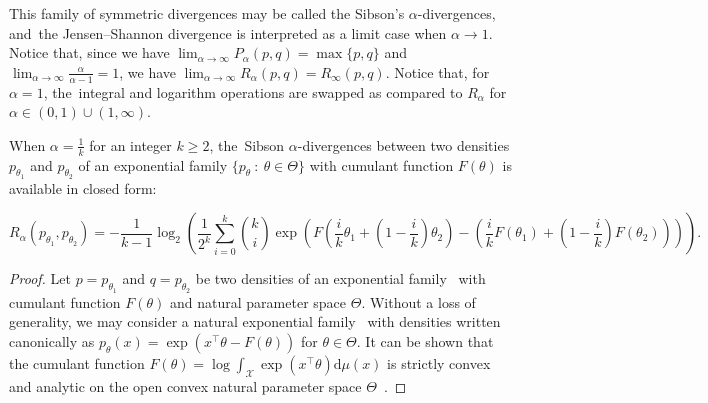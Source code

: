 \documentclass[entropy,article,accept,oneauthor,pdftex,entropy]{Definitions/mdpi}
\def\dmu{\mathrm{d}\mu}
\def\calX{\mathcal{X}}
\def\dmu{\mathrm{d}\mu}
\begin{document}
\begin{paracol}{2}
\switchcolumn


This family of symmetric divergences may be called the Sibson's $\alpha$-divergences, and~the Jensen--Shannon divergence is interpreted
 as a limit case when $\alpha\rightarrow 1$.
Notice that, since we have $\lim_{\alpha\rightarrow\infty} P_\alpha(p,q)=\max\{p,q\}$ and $\lim_{\alpha\rightarrow\infty}\frac{\alpha}{\alpha-1}=1$, we have $\lim_{\alpha\rightarrow\infty} R_\alpha(p,q)=R_\infty(p,q)$.
Notice that, for~$\alpha=1$, the~integral and logarithm operations are swapped as compared to $R_\alpha$ for $\alpha\in(0,1)\cup(1,\infty)$.


\begin{Theorem}\label{thm:cfirfracinteger}
When $\alpha=\frac{1}{k}$ for an integer $k\geq 2$, the~Sibson $\alpha$-divergences between two densities $p_{\theta_1}$ and $p_{\theta_2}$ of an exponential family $\{p_\theta\ :\ \theta\in\Theta\}$ with cumulant function $F(\theta)$ is available in closed form:
\vspace{-12pt}
\begingroup\makeatletter\def\f@size{8}\check@mathfonts
\def\maketag@@@#1{\hbox{\m@th\normalsize\normalfont#1}}%

$$
R_\alpha(p_{\theta_1},p_{\theta_2})=-\frac{1}{k-1}\log_2 \left( \frac{1}{2^k} \sum_{i=0}^k \binom{k}{i}  \exp\left(F\left(\frac{i}{k}\theta_1+\left(1-\frac{i}{k}\right)\theta_2\right)-\left(\frac{i}{k}F(\theta_1)+\left(1-\frac{i}{k}\right)F(\theta_2)\right)\right) \right).
$$
\endgroup
\end{Theorem}


\begin{proof}
Let $p=p_{\theta_1}$ and $q=p_{\theta_2}$ be two densities of an exponential family~\cite{EF-2014} with  cumulant function $F(\theta)$ and natural  parameter space $\Theta$. 
Without a loss of generality, we may consider a natural exponential family~\cite{EF-2014} with densities written canonically as $p_\theta(x)=\exp(x^\top\theta-F(\theta))$ for $\theta\in\Theta$.
It can be shown that the cumulant function $F(\theta)=\log \int_\calX \exp(x^\top\theta) \dmu(x)$ is strictly convex and analytic on the open convex natural parameter space $\Theta$~\cite{EF-2014}.



\end{proof}
\end{paracol}
\end{document}
